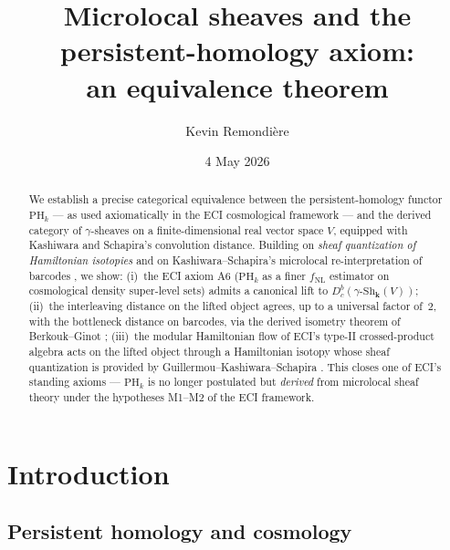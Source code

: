 \documentclass[12pt,a4paper]{amsart}
\theoremstyle{definition}
\newcommand{\kk}{\mathbf{k}}                %
\newcommand{\Sh}{\mathrm{Sh}}               %
\newcommand{\Dbc}{D^b_c}                     %
\newcommand{\PHk}{\mathrm{PH}_k}            %
\begin{document}
\title[Microlocal sheaves and the PH$_k$ axiom]{%
  Microlocal sheaves and the persistent-homology axiom:\\
  an equivalence theorem}

\author{Kevin Remondi\`ere}
\address{Independent Researcher, ORCID \href{https://orcid.org/0009-0008-2443-7166}{0009-0008-2443-7166}}
\date{4 May 2026}

\begin{abstract}
  We establish a precise categorical equivalence between the
  persistent-homology functor $\PHk$ --- as used axiomatically in the
  ECI cosmological framework --- and the derived category of
  $\gamma$-sheaves on a finite-dimensional real vector space $V$,
  equipped with Kashiwara and Schapira's convolution distance.
  Building on \emph{sheaf quantization of Hamiltonian isotopies}
  \cite{GKS2012} and on Kashiwara--Schapira's microlocal
  re-interpretation of barcodes \cite{KS2018}, we show:
  (i)~the ECI axiom \textup{A6} ($\PHk$ as a finer $f_\mathrm{NL}$
  estimator on cosmological density super-level sets) admits a canonical
  lift to $\Dbc(\gamma\text{-}\Sh_\kk(V))$;
  (ii)~the interleaving distance on the lifted object agrees, up to a
  universal factor of~$2$, with the bottleneck distance on barcodes,
  via the derived isometry theorem of Berkouk--Ginot \cite{BG2018};
  (iii)~the modular Hamiltonian flow of ECI's type-II crossed-product
  algebra acts on the lifted object through a Hamiltonian isotopy whose
  sheaf quantization is provided by Guillermou--Kashiwara--Schapira
  \cite{GKS2012}.
  This closes one of ECI's standing axioms --- $\PHk$ is no longer
  postulated but \emph{derived} from microlocal sheaf theory under the
  hypotheses M1--M2 of the ECI framework.
\end{abstract}

\maketitle
\tableofcontents

\section{Introduction}
\label{sec:intro}

\subsection*{Persistent homology and cosmology}
\end{document}
